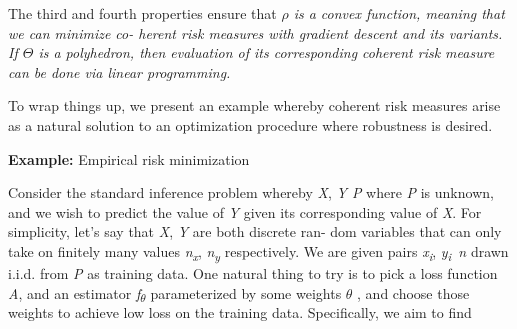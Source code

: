 \documentclass[12pt,twoside]{article}
\begin{document}
\begin{adjustwidth}{0.58in}{0.08in}
{\fontsize{10pt}{12.0pt}\selectfont The third and fourth properties ensure that \textit{$ \rho $  is a convex function, meaning that we can minimize co- herent risk measures with gradient descent and its variants. If $ \Theta $  is a polyhedron, then evaluation of its corresponding coherent risk measure can be done via linear programming.}\par}\par

\end{adjustwidth}

\begin{adjustwidth}{0.58in}{0.14in}
{\fontsize{10pt}{12.0pt}\selectfont To wrap things up, we present an example whereby coherent risk measures arise as a natural solution to an optimization procedure where robustness is desired.\par}\par

\end{adjustwidth}

\begin{adjustwidth}{0.58in}{0.0in}
\begin{FlushLeft}
{\fontsize{10pt}{12.0pt}\selectfont \textbf{Example: }Empirical risk minimization\par}
\end{FlushLeft}\par

\end{adjustwidth}

\begin{adjustwidth}{0.58in}{0.14in}
Consider the standard inference problem whereby  \textit{X}, \textit{Y \tabto{4.18in} P }where \textit{P }is unknown, and we wish to predict the value of \textit{Y }given its corresponding value of \textit{X}. For simplicity, let’s say that \textit{X}, \textit{Y }are both discrete ran- dom variables that can only take on finitely many values \textit{n\textsubscript{x}}, \textit{n\textsubscript{y} }respectively. We are given pairs \textit{x\textsubscript{i}}, \textit{y\textsubscript{i}\  n }drawn i.i.d. from \textit{P }as training data. One natural thing to try is to pick a loss function \textit{A}, and an estimator \textit{f\textsubscript{$ \theta $ } }parameterized by some weights \textit{$ \theta $ }, and choose those weights to achieve low loss on the training data. Specifically, we aim to find\par

\end{adjustwidth}
\end{document}
